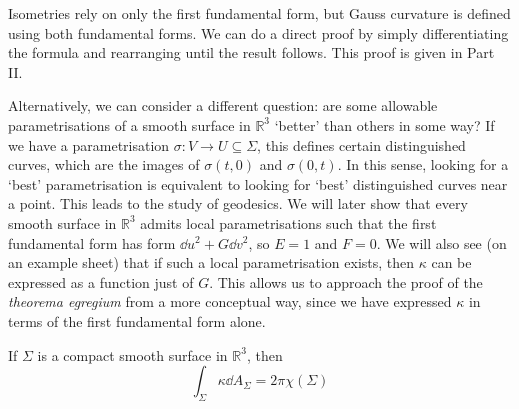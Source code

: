 \begin{remark}
	Isometries rely on only the first fundamental form, but Gauss curvature is defined using both fundamental forms.
	We can do a direct proof by simply differentiating the formula and rearranging until the result follows.
	This proof is given in Part II.

	Alternatively, we can consider a different question: are some allowable parametrisations of a smooth surface in \( \mathbb R^3 \) `better' than others in some way?
	If we have a parametrisation \( \sigma \colon V \to U \subseteq \Sigma \), this defines certain distinguished curves, which are the images of \( \sigma(t,0) \) and \( \sigma(0,t) \).
	In this sense, looking for a `best' parametrisation is equivalent to looking for `best' distinguished curves near a point.
	This leads to the study of geodesics.
	We will later show that every smooth surface in \( \mathbb R^3 \) admits local parametrisations such that the first fundamental form has form \( \dd{u}^2 + G \dd{v}^2 \), so \( E = 1 \) and \( F = 0 \).
	We will also see (on an example sheet) that if such a local parametrisation exists, then \( \kappa \) can be expressed as a function just of \( G \).
	This allows us to approach the proof of the \textit{theorema egregium} from a more conceptual way, since we have expressed \( \kappa \) in terms of the first fundamental form alone.
\end{remark}
\begin{theorem}
	If \( \Sigma \) is a compact smooth surface in \( \mathbb R^3 \), then
	\[
		\int_\Sigma \kappa \dd{A_\Sigma} = 2 \pi \chi(\Sigma)
	\]
\end{theorem}
